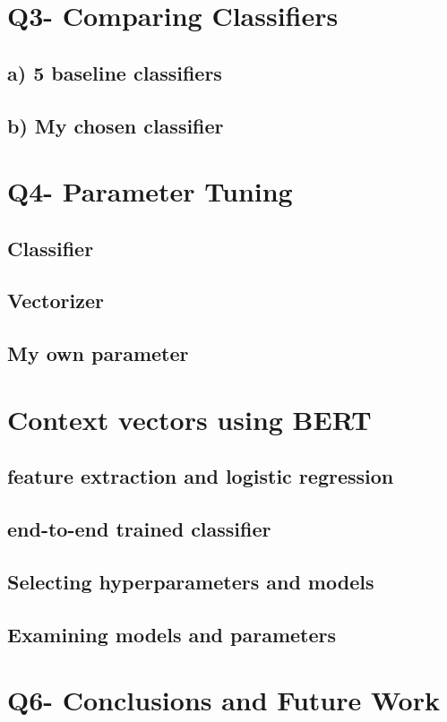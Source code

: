 \documentclass[a4paper,11pt]{article}
\begin{document}
\section{Q3- Comparing Classifiers}
\subsection{a) 5 baseline classifiers}
\subsection{b) My chosen classifier}

\section{Q4- Parameter Tuning}
\subsection{Classifier}
\subsection{Vectorizer}
\subsection{My own parameter}


\section{Context vectors using BERT}
\subsection{feature extraction and logistic regression}
\subsection{end-to-end trained classifier}
\subsection{Selecting hyperparameters and models}
\subsection{Examining models and parameters}


\section{Q6- Conclusions and Future Work}
\end{document}
